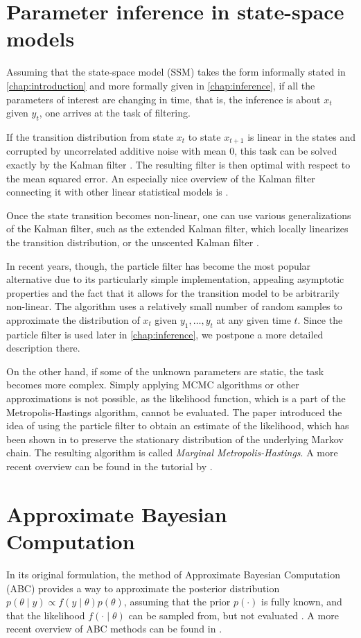 \section{Parameter inference in state-space models}
Assuming that the state-space model (SSM) takes the form informally stated in \autoref{chap:introduction} and more formally given in \autoref{chap:inference}, if all the parameters of interest are changing in time, that is, the inference is about $x_t$ given $y_t$, one arrives at the task of filtering.

If the transition distribution from state $x_t$ to state $x_{t+1}$ is linear in the states and corrupted by uncorrelated additive noise with mean 0, this task can be solved exactly by the Kalman filter \citep{kalman}. The resulting filter is then optimal with respect to the mean squared error. An especially nice overview of the Kalman filter connecting it with other linear statistical models is \cite{lds}.

Once the state transition becomes non-linear, one can use various generalizations of the Kalman filter, such as the extended Kalman filter, which locally linearizes the transition distribution, or the unscented Kalman filter \citep{ukf}.

In recent years, though, the particle filter \citep{particle-filter} has become the most popular alternative due to its particularly simple implementation, appealing asymptotic properties and the fact that it allows for the transition model to be arbitrarily non-linear. The algorithm uses a relatively small number of random samples to approximate the distribution of $x_t$ given $y_1, \ldots, y_t$ at any given time $t$. Since the particle filter is used later in \autoref{chap:inference}, we postpone a more detailed description there.

On the other hand, if some of the unknown parameters are static, the task becomes more complex. Simply applying MCMC algorithms or other approximations is not possible, as the likelihood function, which is a part of the Metropolis-Hastings algorithm, cannot be evaluated. The paper \cite{andrieu} introduced the idea of using the particle filter to obtain an estimate of the likelihood, which has been shown in \cite{del-moral} to preserve the stationary distribution of the underlying Markov chain. The resulting algorithm is called \emph{Marginal Metropolis-Hastings}. A more recent overview can be found in the tutorial by \cite{schoen}.

\section{Approximate Bayesian Computation}
In its original formulation, the method of Approximate Bayesian Computation (ABC) provides a way to approximate the posterior distribution $p(\theta \mid y) \propto f(y \mid \theta) p(\theta)$, assuming that the prior $p(\cdot)$ is fully known, and that the likelihood $f(\cdot \mid \theta)$ can be sampled from, but not evaluated \citep{abc-old-old, abc-old}. A more recent overview of ABC methods can be found in \cite{abc-recent}.

